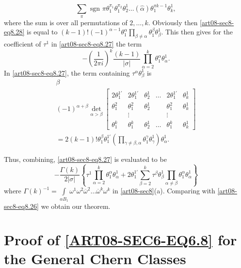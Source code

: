 \begin{equation}
\sum\limits_{\pi}\text{ sgn } \pi\theta^{\pi_{1}}_{1}\theta^{\pi_{2}}_{1}\theta^{1}_{2}\ldots(\widehat{\alpha})\theta^{\pi k-1}_{1}\theta^{1}_{k},\label{art08-sec8-eq8.28}
\end{equation}
where the sum is over all permutations of $2,\ldots, k$. Obviously then \eqref{art08-sec8-eq8.28} is equal to $(k-1)!(-1)^{\alpha-1}\theta^{\alpha}_{1}\prod\limits_{\beta\neq \alpha}\theta^{\beta}_{1}\theta^{1}_{\beta}$. This then gives for the coefficient of $\tau^{1}$ in \eqref{art08-sec8-eq8.27} the term
\begin{equation}
-\left(\dfrac{1}{2\pi i}\right)^{k}\dfrac{(k-1)}{|\sigma|}\prod\limits^{k}_{\alpha=2}\theta^{\alpha}_{1}\theta^{1}_{\alpha}.\label{art08-sec8-eq8.29}
\end{equation}
In \eqref{art08-sec8-eq8.27}, the term containing $\tau^{\alpha}\theta^{1}_{\beta}$ is 
\begin{gather*}
\beta\\
(-1)^{\alpha+\beta}\det_{\alpha>\beta}
\begin{bmatrix}
2\theta^{1'}_{1} & 2\theta^{1'}_{1} & \theta^{1}_{2} & \ldots & 2\theta^{1'}_{1} & \theta^{1}_{k}\\
\theta^{2}_{1} & \theta^{2}_{1} & \theta^{1}_{2} & & \theta^{2}_{1} & \theta^{1}_{k}\\
 & \vdots & & & \vdots & \\
\theta^{k}_{1} & \theta^{k}_{1} & \theta^{1}_{2} & \ldots & \theta^{k}_{1} & \theta^{1}_{k}
\end{bmatrix}\\
=2(k-1)!\theta^{\beta}_{1}\theta^{1'}_{1}\left(\prod\limits_{\gamma\neq \beta,\alpha}\theta^{\gamma}_{1}\theta^{1}_{\gamma}\right)\theta^{1}_{\alpha}.
\end{gather*}

Thus, combining, \eqref{art08-sec8-eq8.27} is evaluated to be
$$
-\dfrac{\Gamma(k)}{2|\sigma|}\left\{\tau^{1}\prod\limits^{k}_{\alpha=2}\theta^{\alpha}_{1}\theta^{1}_{\alpha}+2\theta^{1'}_{1}\sum\limits^{k}_{\beta=2}\tau^{\beta}\theta^{1}_{\beta}\prod\limits_{\alpha\neq \beta}\theta^{\alpha}_{1}\theta^{1}_{\alpha}\right\}
$$
where $\Gamma(k)^{-1}=\int\limits_{\alpha B_{1}}\omega^{1}\omega^{2}\overline{\omega}^{2}\ldots\overline{\omega}^{k}\omega^{k}$ in \ref{art08-sec8}(a). Comparing with \eqref{art08-sec8-eq8.26} we obtain our theorem.

\section{Proof of \texorpdfstring{\eqref{ART08-SEC6-EQ6.8}}{eq6.8} for the General Chern Classes}\label{art08-sec9}

